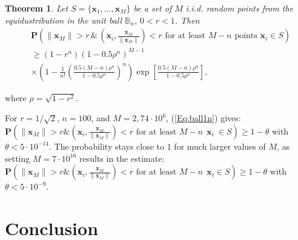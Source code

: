 \documentclass[final,5p,times,twocolumn]{elsarticle}
\newtheorem{theorem}{Theorem}
\begin{document}
\begin{theorem}\label{CascadeSep}
Let $S=\{\boldsymbol{x}_1, \ldots , \boldsymbol{x}_M\}$ be a set of $M$  i.i.d. random points  from the equidustribution in the unit ball $\mathbb{B}_n$, $0<r<1$. Then
\begin{equation}\label{Eq:ball1n}
\begin{split}
&\mathbf{P} \left(\|\boldsymbol{x}_M\|>r \, \&\,  \left(\boldsymbol{x}_i,\frac{\boldsymbol{x}_M}{\| \boldsymbol{x}_M\| }\right)<r
 \mbox{ for at least } M\!-\!n \mbox{ points }  \boldsymbol{x}_i\in S\right)  \\
& \geq (1-r^n)(1-0.5\rho^{n})^{M-1} \\
&\times  \left(1-\frac{1}{n!}\left(\frac{0.5(M-n)\rho^{n}}{1-0.5\rho^{n}}\right)^n\right) \exp{\left[\frac{0.5(M-n)\rho^{n}}{1-0.5\rho^{n}}\right]},
\end{split}
\end{equation}
\end{theorem}
where $\rho=\sqrt{1-r^2}$.

For $r=1/\sqrt{2}$, $n=100$, and $M=2,74\cdot 10^6$, (\ref{Eq:ball1n}) gives:  $\mathbf{P} \left(\|\boldsymbol{x}_M\|>r \& \left(\boldsymbol{x}_i,\frac{\boldsymbol{x}_M}{\| \boldsymbol{x}_M\| }\right)<r
 \mbox{ for at least } M\!-\!n \ \ \boldsymbol{x}_i\ \in S\right) \geq 1-\theta$ with $\theta<5\cdot 10^{-14}$. The probability stays close to $1$ for much larger values of  $M$, as setting $M=7\cdot 10^{16}$ results in the estimate: $\mathbf{P} \left(\|\boldsymbol{x}_M\|>r \& \left(\boldsymbol{x}_i,\frac{\boldsymbol{x}_M}{\| \boldsymbol{x}_M\| }\right)<r
 \mbox{ for at least } M\!-\!n \ \ \boldsymbol{x}_i\in S\right) \geq 1-\theta$ with $\theta<5\cdot 10^{-9}$.



\section{Conclusion}
\end{document}
